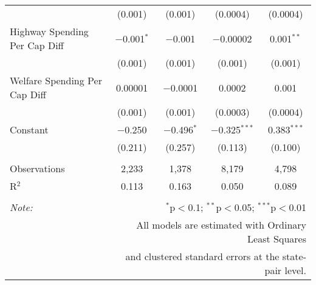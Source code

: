 \begin{table}[!htbp]
\begin{tabular}{@{\extracolsep{5pt}}lcccc}
  & (0.001) & (0.001) & (0.0004) & (0.0004) \\ 
  Highway Spending Per Cap Diff & $-$0.001$^{*}$ & $-$0.001 & $-$0.00002 & 0.001$^{**}$ \\ 
  & (0.001) & (0.001) & (0.001) & (0.001) \\ 
  Welfare Spending Per Cap Diff & 0.00001 & $-$0.0001 & 0.0002 & 0.001 \\ 
  & (0.001) & (0.001) & (0.0003) & (0.0004) \\ 
  Constant & $-$0.250 & $-$0.496$^{*}$ & $-$0.325$^{***}$ & 0.383$^{***}$ \\ 
  & (0.211) & (0.257) & (0.113) & (0.100) \\ 
 \hline \\[-1.8ex] 
Observations & 2,233 & 1,378 & 8,179 & 4,798 \\ 
R$^{2}$ & 0.113 & 0.163 & 0.050 & 0.089 \\ 
\hline 
\hline \\[-1.8ex] 
\textit{Note:}  & \multicolumn{4}{r}{$^{*}$p$<$0.1; $^{**}$p$<$0.05; $^{***}$p$<$0.01} \\ 
 & \multicolumn{4}{r}{All models are estimated with Ordinary Least Squares} \\ 
 & \multicolumn{4}{r}{and clustered standard errors at the state-pair level.} \\ 
\end{tabular} 
\end{table} 
